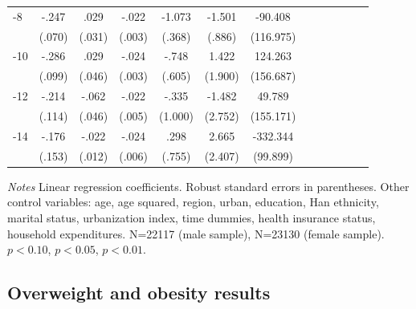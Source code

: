 \begin{table}[p]
\begin{adjustbox}{max width=\linewidth}
\begin{threeparttable}
{\begin{tabular}{l*{6}{SS}}
-8             &    -.247\sym{***}&     .029         &    -.022\sym{***}&   -1.073\sym{***}&   -1.501\sym{*}  &  -90.408         \\
                &   (.070)         &   (.031)         &   (.003)         &   (.368)         &   (.886)         &(116.975)         \\
-10            &    -.286\sym{***}&     .029         &    -.024\sym{***}&    -.748         &    1.422         &  124.263         \\
                &   (.099)         &   (.046)         &   (.003)         &   (.605)         &  (1.900)         &(156.687)         \\
-12           &    -.214\sym{*}  &    -.062         &    -.022\sym{***}&    -.335         &   -1.482         &   49.789         \\
                &   (.114)         &   (.046)         &   (.005)         &  (1.000)         &  (2.752)         &(155.171)         \\
-14           &    -.176         &    -.022\sym{*}  &    -.024\sym{***}&     .298         &    2.665         & -332.344\sym{***}\\
                &   (.153)         &   (.012)         &   (.006)         &   (.755)         &  (2.407)         & (99.899)         \\ 
\bottomrule
\end{tabular}
\begin{tablenotes}
\item \footnotesize \textit{Notes}  Linear regression coefficients. Robust standard errors in parentheses.
Other control variables: age, age squared, region, urban, education, Han ethnicity, marital status, urbanization index, time dummies, health insurance status, household expenditures. N=22117 (male sample), N=23130 (female sample). \sym{*} \(p<0.10\), \sym{**} \(p<0.05\), \sym{***} \(p<0.01\).
\end{tablenotes}
}
\end{threeparttable}
\end{adjustbox}
\end{table}


\clearpage




\subsection*{Overweight and obesity results}

